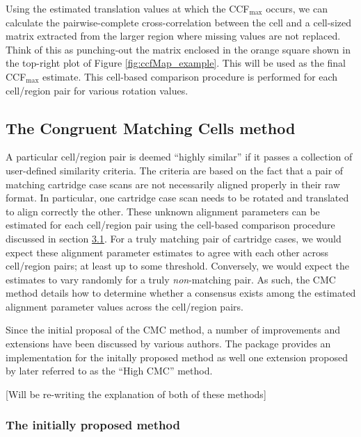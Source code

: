 Using the estimated translation values at which the CCF\(_{\max}\)
occurs, we can calculate the pairwise-complete cross-correlation between
the cell and a cell-sized matrix extracted from the larger region where
missing values are not replaced. Think of this as punching-out the
matrix enclosed in the orange square shown in the top-right plot of
Figure \ref{fig:ccfMap_example}. This will be used as the final
CCF\(_{\max}\) estimate. This cell-based comparison procedure is
performed for each cell/region pair for various rotation values.

\hypertarget{the-congruent-matching-cells-method}{%
\subsection{The Congruent Matching Cells
method}\label{the-congruent-matching-cells-method}}

A particular cell/region pair is deemed ``highly similar'' if it passes
a collection of user-defined similarity criteria. The criteria are based
on the fact that a pair of matching cartridge case scans are not
necessarily aligned properly in their raw format. In particular, one
cartridge case scan needs to be rotated and translated to align
correctly the other. These unknown alignment parameters can be estimated
for each cell/region pair using the cell-based comparison procedure
discussed in section \protect\hyperlink{comparisonProcedure}{3.1}. For a
truly matching pair of cartridge cases, we would expect these alignment
parameter estimates to agree with each other across cell/region pairs;
at least up to some threshold. Conversely, we would expect the estimates
to vary randomly for a truly \emph{non}-matching pair. As such, the CMC
method details how to determine whether a consensus exists among the
estimated alignment parameter values across the cell/region pairs.

Since the initial proposal of the CMC method, a number of improvements
and extensions have been discussed by various authors. The 
package provides an implementation for the initally proposed method as
well one extension proposed by \citet{tong_improved_2015} later referred
to as the ``High CMC'' method.

{[}Will be re-writing the explanation of both of these methods{]}

\hypertarget{the-initially-proposed-method}{%
\subsubsection{The initially proposed
method}\label{the-initially-proposed-method}}

